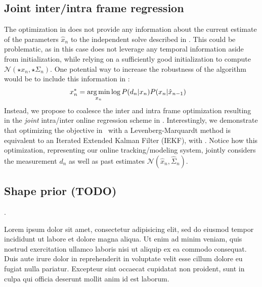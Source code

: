 \subsection{Joint inter/intra frame regression}
The optimization in  does not provide any information about the current estimate of the parameters $\hat{x}_n$ to the independent solve described in . This could be problematic, as in this case  does not leverage any temporal information aside from initialization, while relying on a sufficiently good initialization to compute $\mathcal{N}(\star{x}_n, \star{\Sigma}_n)$. One potential way to increase the robustness of the algorithm would be to include this information in :
% 
\begin{align}
x_n^* &= \operatorname*{arg\,min}_{x_n} \log  P(d_n|x_n) P(x_n |\hat{x}_{n - 1}) 
\label{eq:independenttemp}
\end{align}
% 
Instead, we propose to coalesce the inter and intra frame optimization resulting in the \emph{joint} intra/inter online regression scheme in . Interestingly, we demonstrate that optimizing the objective in~ with a Levenberg-Marquardt method is equivalent to an Iterated Extended Kalman Filter (IEKF), with .
% 
Notice how this optimization, representing our online tracking/modeling system, jointly considers the measurement $d_n$ as well as past estimates $\mathcal{N}(\hat{x}_n, \hat{\Sigma}_n)$.

\subsection{Shape prior (TODO)}
\label{sec:shapeprior}
. 

\newpage
\begin{DRAFT}
    Lorem ipsum dolor sit amet, consectetur adipisicing elit, sed do eiusmod tempor incididunt ut labore et dolore magna aliqua. Ut enim ad minim veniam, quis nostrud exercitation ullamco laboris nisi ut aliquip ex ea commodo consequat. Duis aute irure dolor in reprehenderit in voluptate velit esse cillum dolore eu fugiat nulla pariatur. Excepteur sint occaecat cupidatat non proident, sunt in culpa qui officia deserunt mollit anim id est laborum.    
\end{DRAFT}